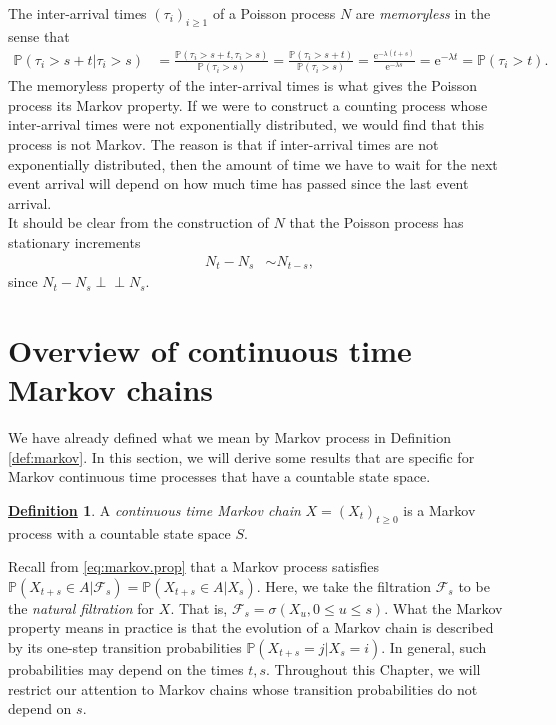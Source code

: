 \documentclass[12pt]{book}
\numberwithin{equation}{chapter}
\theoremstyle{plain}
\numberwithin{theorem}{section}
\theoremstyle{definition}
\newtheorem{definition}[theorem]{\underline{Definition}}
\numberwithin{exercise}{chapter}
\newcommand{\<}{\langle}
\renewcommand{\>}{\rangle}
\renewcommand{\(}{\left(}
\renewcommand{\)}{\right)}
\renewcommand{\[}{\left[}
\renewcommand{\]}{\right]}
\newcommand\Pb{\mathds{P}}
\newcommand\Fc{\mathscr{F}}
\newcommand\sig{\sigma}
\newcommand\lam{\lambda}
\newcommand{\ind}{\perp \! \! \! \perp}
\newcommand\ee{\mathrm{e}}
\begin{document}
\noindent
The inter-arrival times $(\tau_i)_{i \geq 1}$ of a Poisson process $N$ are \emph{memoryless} in the sense that
\begin{align}
\Pb(\tau_i > s+t | \tau_i > s)
	&=	\frac{\Pb(\tau_i > s+t , \tau_i > s)}{\Pb(\tau_i > s)}
	=		\frac{\Pb(\tau_i > s+t)}{\Pb(\tau_i > s)}
	=		\frac{\ee^{-\lam(t+s)}}{\ee^{-\lam s}}
	=		\ee^{-\lam t}
	=		\Pb( \tau_i > t ) . \label{eq:memoryless}
\end{align}
The memoryless property of the inter-arrival times is what gives the Poisson process its Markov property.  If we were to construct a counting process whose inter-arrival times were not exponentially distributed, we would find that this process is not Markov.  The reason is that if inter-arrival times are not exponentially distributed, then the amount of time we have to wait for the next event arrival will depend on how much time has passed since the last event arrival.
\\[0.5em]
It should be clear from the construction of $N$ that the Poisson process has stationary increments
\begin{align}
N_t - N_s
	&\sim N_{t-s} ,
\end{align}
since $N_t - N_s \ind N_s$.


\section{Overview of continuous time Markov chains}
\label{sec:ctmc}
We have already defined what we mean by Markov process in Definition \ref{def:markov}.  In this section, we will derive some results that are specific for Markov continuous time processes that have a countable state space.

\begin{definition}
A \emph{continuous time Markov chain} $X = (X_t)_{t  \geq 0}$ is a Markov process with a countable state space $S$.
\end{definition}

\noindent
Recall from \eqref{eq:markov.prop} that a Markov process satisfies $\Pb( X_{t+s} \in A | \Fc_s) = \Pb( X_{t+s} \in A | X_s)$.  Here, we take the filtration $\Fc_s$ to be the \emph{natural filtration} for $X$.  That is, $\Fc_s = \sig(X_u,0\leq u \leq s)$.   What the Markov property means in practice is that the evolution of a Markov chain is described by its one-step transition probabilities $\Pb( X_{t+s} = j | X_s = i)$.  In general, such probabilities may depend on the times $t,s$.  Throughout this Chapter, we will restrict our attention to Markov chains whose transition probabilities do not depend on $s$.
\end{document}
